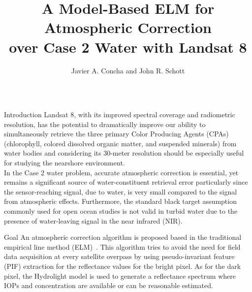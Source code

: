 \documentclass{beamer}
\title{ \huge A Model-Based ELM for Atmospheric Correction \\over Case 2 Water with Landsat 8}
\author[]{Javier A. Concha and John R. Schott}
\institute[Rochester Institute of Technology]{Digital Imaging and Remote Sensing Laboratory, Chester F. Carlson Center for Imaging Science\\ Rochester Institute of Technology, Rochester, New York, USA}
\begin{document}
\begin{frame}{} 
  \begin{columns}[t]
    

\begin{column}{.3\linewidth}
\begin{block}{Introduction}
\justifying\small Landsat 8, with its improved spectral coverage and radiometric resolution, has the potential to dramatically improve our ability to simultaneously retrieve the three primary Color Producing Agents (CPAs) (chlorophyll, colored dissolved organic matter, and suspended minerals) from water bodies and considering its 30-meter resolution should be especially useful for studying the nearshore environment.\\
\vspace{.5cm}
In the Case 2 water problem, accurate atmospheric correction is essential, yet remains a significant source of water-constituent retrieval error particularly since the sensor-reaching signal, due to water, is very small compared to the signal from atmospheric effects. Furthermore, the standard black target assumption commonly used for open ocean studies is not valid in turbid water due to the presence of water-leaving signal in the near infrared (NIR).
\vspace{.5cm}
\end{block}
      
\begin{block}{Goal}
\justifying\small An atmospheric correction algorithm is proposed based in the traditional empirical line method (ELM)~\cite{Gerace:2013,Gerace:2012}. This algorithm tries to avoid the need for field data acquisition at every satellite overpass by using pseudo-invariant feature (PIF) extraction for the reflectance values for the bright pixel. As for the dark pixel, the Hydrolight model is used to generate a reflectance spectrum where IOPs and concentration are available or can be reasonable estimated.
\vspace{.5cm}
\end{block}


\end{column}
\end{columns}
\end{frame}
\end{document}
